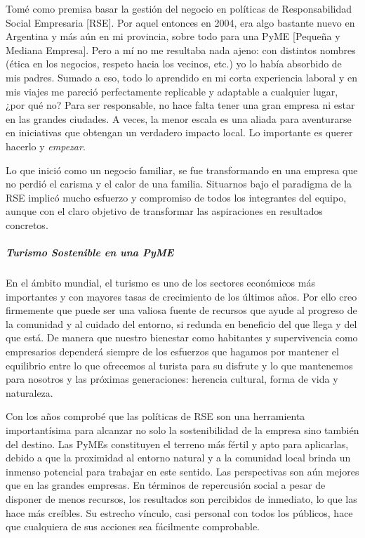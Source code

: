 \documentclass[
]{article}
\begin{document}
Tomé como premisa basar la gestión del negocio en políticas de
Responsabilidad Social Empresaria {[}RSE{]}. Por aquel entonces en 2004,
era algo bastante nuevo en Argentina y más aún en mi provincia, sobre
todo para una PyME {[}Pequeña y Mediana Empresa{]}. Pero a mí no me
resultaba nada ajeno: con distintos nombres (ética en los negocios,
respeto hacia los vecinos, etc.) yo lo había absorbido de mis padres.
Sumado a eso, todo lo aprendido en mi corta experiencia laboral y en mis
viajes me pareció perfectamente replicable y adaptable a cualquier
lugar, ¿por qué no? Para ser responsable, no hace falta tener una gran
empresa ni estar en las grandes ciudades. A veces, la menor escala es
una aliada para aventurarse en iniciativas que obtengan un verdadero
impacto local. Lo importante es querer hacerlo y \emph{empezar}.

Lo que inició como un negocio familiar, se fue transformando en una
empresa que no perdió el carisma y el calor de una familia. Situarnos
bajo el paradigma de la RSE implicó mucho esfuerzo y compromiso de todos
los integrantes del equipo, aunque con el claro objetivo de transformar
las aspiraciones en resultados concretos.

\hypertarget{turismo-sostenible-en-una-pyme}{%
\subparagraph{Turismo Sostenible en una
PyME}\label{turismo-sostenible-en-una-pyme}}

En el ámbito mundial, el turismo es uno de los sectores económicos más
importantes y con mayores tasas de crecimiento de los últimos años. Por
ello creo firmemente que puede ser una valiosa fuente de recursos que
ayude al progreso de la comunidad y al cuidado del entorno, si redunda
en beneficio del que llega y del que está. De manera que nuestro
bienestar como habitantes y supervivencia como empresarios dependerá
siempre de los esfuerzos que hagamos por mantener el equilibrio entre lo
que ofrecemos al turista para su disfrute y lo que mantenemos para
nosotros y las próximas generaciones: herencia cultural, forma de vida y
naturaleza.

Con los años comprobé que las políticas de RSE son una herramienta
importantísima para alcanzar no solo la sostenibilidad de la empresa
sino también del destino. Las PyMEs constituyen el terreno más fértil y
apto para aplicarlas, debido a que la proximidad al entorno natural y a
la comunidad local brinda un inmenso potencial para trabajar en este
sentido. Las perspectivas son aún mejores que en las grandes empresas.
En términos de repercusión social a pesar de disponer de menos recursos,
los resultados son percibidos de inmediato, lo que las hace más
creíbles. Su estrecho vínculo, casi personal con todos los públicos,
hace que cualquiera de sus acciones sea fácilmente comprobable.
\end{document}
